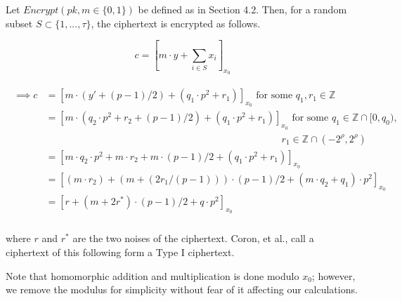 \documentclass[../../main.tex]{subfiles}
\begin{document}
Let $Encrypt(pk,m \in \{0,1\})$ be defined as in Section 4.2. Then, for a random subset $S \subset \{1,...,\tau\}$, the ciphertext is encrypted as follows.

\begin{equation*}
    c = \left[m \cdot y + \sum_{i \in S}{x_i} \right]_{x_0}
\end{equation*}

\begin{align*}
    \begin{split}
        \implies c &= \left[m \cdot \left(y'+(p-1)/2\right) + \left(q_1 \cdot p^2 + r_1\right)\right]_{x_0} \text{ for some } q_1,r_1 \in \mathbb{Z}\\
        &= \left[m \cdot \left(q_2 \cdot p^2 + r_2 + \left(p-1\right)/2\right) + \left(q_1 \cdot p^2+r_1\right) \right]_{x_0} \text{ for some } q_1 \in \mathbb{Z} \cap [0,q_0), \\
        & \qquad\qquad\qquad\qquad\qquad\qquad\qquad\qquad\qquad\qquad\qquad\qquad r_1 \in \mathbb{Z} \cap (-2^\rho, 2^\rho) \\
        &= \left[m \cdot q_2 \cdot p^2 + m \cdot r_2 + m \cdot (p-1)/2 + (q_1 \cdot p^2 + r_1)\right]_{x_0} \\
        &= \left[(m \cdot r_2) + (m+(2r_1/(p-1))) \cdot (p-1)/2 +(m \cdot q_2 + q_1) \cdot p^2 \right]_{x_0}\\
        &= \left[r + (m+2r^*) \cdot (p-1)/2 + q \cdot p^2 \right]_{x_0}\\
    \end{split}
\end{align*}

\noindent where $r$ and $r^*$ are the two noises of the ciphertext. Coron, et al., call a ciphertext of this following form a Type I ciphertext.

\noindent Note that homomorphic addition and multiplication is done modulo $x_0$; however, we remove the modulus for simplicity without fear of it affecting our calculations.
\end{document}
